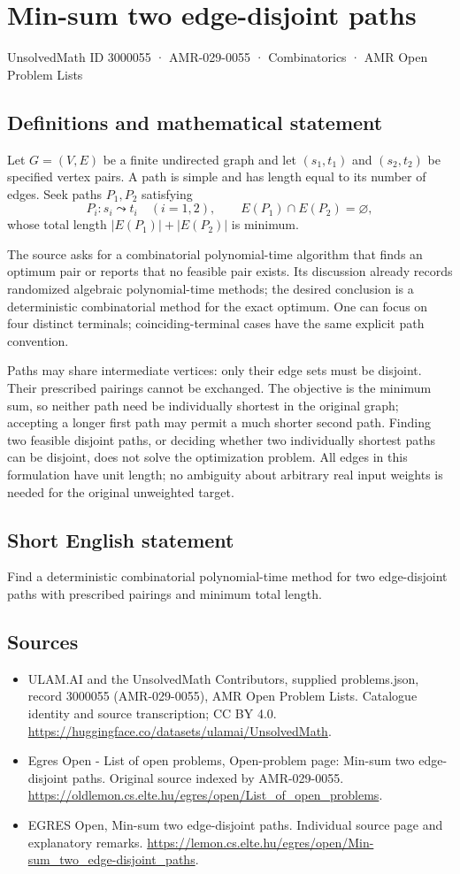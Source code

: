 \documentclass[11pt,a4paper]{article}
\begin{document}
\section*{Min-sum two edge-disjoint paths}\label{3000055}
{\small UnsolvedMath ID 3000055 · AMR-029-0055 · Combinatorics · AMR Open Problem Lists}
\subsection{Definitions and mathematical statement}
Let $G=(V,E)$ be a finite undirected graph and let $(s_1,t_1)$ and
$(s_2,t_2)$ be specified vertex pairs. A path is simple and has length
equal to its number of edges. Seek paths $P_1,P_2$ satisfying
\[
 P_i:s_i\leadsto t_i\quad(i=1,2),\qquad
 E(P_1)\cap E(P_2)=\varnothing,
\]
whose total length $|E(P_1)|+|E(P_2)|$ is minimum.

The source asks for a combinatorial polynomial-time algorithm that
finds an optimum pair or reports that no feasible pair exists.
Its discussion already records randomized algebraic polynomial-time
methods; the desired conclusion is a deterministic combinatorial
method for the exact optimum. One can focus on four distinct terminals;
coinciding-terminal cases have the same explicit path convention.

Paths may share intermediate vertices: only their edge sets must be
disjoint. Their prescribed pairings cannot be exchanged. The objective
is the minimum sum, so neither path need be individually shortest
in the original graph; accepting a longer first path may permit a
much shorter second path. Finding two feasible disjoint paths, or
deciding whether two individually shortest paths can be disjoint,
does not solve the optimization problem. All edges in this formulation
have unit length; no ambiguity about arbitrary real input weights
is needed for the original unweighted target.
\subsection{Short English statement}
Find a deterministic combinatorial polynomial-time method for
two edge-disjoint paths with prescribed pairings and minimum total length.
\subsection{Sources}
\begin{itemize}
\item[S1] ULAM.AI and the UnsolvedMath Contributors, supplied problems.json, record 3000055 (AMR-029-0055), AMR Open Problem Lists. Catalogue identity and source transcription; CC BY 4.0.
\url{https://huggingface.co/datasets/ulamai/UnsolvedMath}.
\item[S2] Egres Open - List of open problems, Open-problem page: Min-sum two edge-disjoint paths. Original source indexed by AMR-029-0055.
\url{https://oldlemon.cs.elte.hu/egres/open/List_of_open_problems}.
\item[S3] EGRES Open, Min-sum two edge-disjoint paths. Individual source page and explanatory remarks.
\url{https://lemon.cs.elte.hu/egres/open/Min-sum_two_edge-disjoint_paths}.
\end{itemize}
\end{document}
